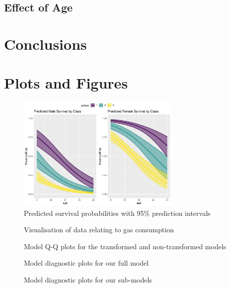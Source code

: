 \documentclass[]{extarticle}
\begin{document}
\subsection{Effect of Age}

\section{Conclusions}

%

\appendix

\section{Plots and Figures}

\begin{figure}[H]
	\centering
	\includegraphics[width=0.7\textwidth]{psurvage}
	\caption{Predicted survival probabilities with 95\% prediction intervals}
	\label{fig:psurvage}
\end{figure}

\begin{figure}[H]
	\centering
	\caption{Visualisation of data relating to gas consumption}
	\label{fig:datavis}
\end{figure}


\begin{figure}[H]
	\centering
	\caption{Model Q-Q plots for the transformed and non-transformed models}
	\label{fig:qqplots}
\end{figure}

\begin{figure}[H]
	\centering
	\caption{Model diagnostic plots for our full model}
	\label{fig:fmdiag}
\end{figure}

\begin{figure}[H]
	\centering
	\caption{Model diagnostic plots for our sub-models}
	\label{fig:smdiag}
\end{figure}
\end{document}
